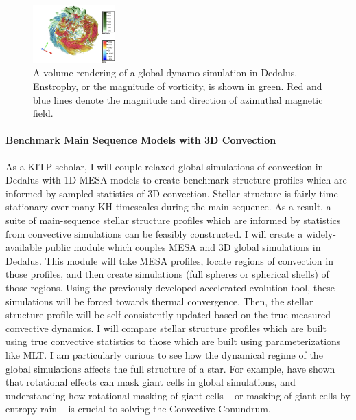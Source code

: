 \documentclass[preprint, hmargin=1in, vmargin=1in]{aastex62}
\begin{document}
\begin{figure}
	\begin{center}
	\vspace{-16pt}
    \includegraphics[width=0.28\textwidth]{./figs/mdwarf.png}
	\vspace{-16pt}
	\end{center}
    \caption{A volume rendering of a global dynamo simulation in Dedalus.
	Enstrophy, or the magnitude of vorticity, is shown in green.
	Red and blue lines denote the magnitude and direction of azimuthal magnetic field.
	\label{fig:mdwarf} }
	\vspace{-16pt}
\end{figure}

\paragraph{Benchmark Main Sequence Models with 3D Convection}
As a KITP scholar, I will couple relaxed global simulations of convection in Dedalus with 1D MESA models to create benchmark structure profiles which are informed by sampled statistics of 3D convection.
Stellar structure is fairly time-stationary over many KH timescales during the main sequence.
As a result, a suite of main-sequence stellar structure profiles which are informed by statistics from convective simulations can be feasibly constructed.
I will create a widely-available public module which couples MESA and 3D global simulations in Dedalus.
This module will take MESA profiles, locate regions of convection in those profiles, and then create simulations (full spheres or spherical shells) of those regions.
Using the previously-developed accelerated evolution tool, these simulations will be forced towards thermal convergence.
Then, the stellar structure profile will be self-consistently updated based on the true measured convective dynamics.
I will compare stellar structure profiles which are built using true convective statistics to those which are built using parameterizations like MLT.
I am particularly curious to see how the dynamical regime of the global simulations affects the full structure of a star.
For example, \citet{featherstone&hindman2016} have shown that rotational effects can mask giant cells in global simulations, and understanding how rotational masking of giant cells -- or masking of giant cells by entropy rain -- is crucial to solving the Convective Conundrum.
\end{document}
